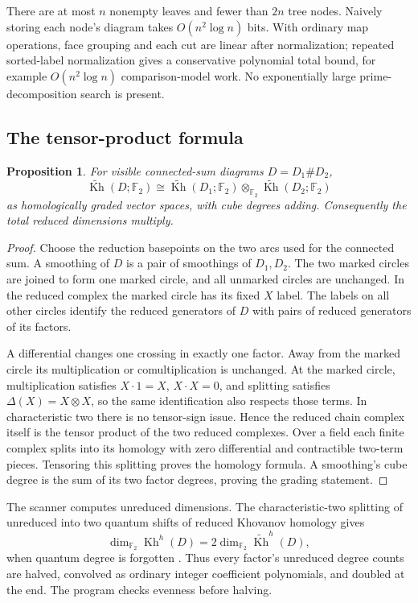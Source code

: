 \documentclass[11pt]{article}
\newtheorem{proposition}[theorem]{Proposition}
\theoremstyle{remark}\newtheorem{remark}[theorem]{Remark}
\newcommand{\F}{\mathbb F}
\newcommand{\Kh}{\operatorname{Kh}}
\newcommand{\rKh}{\widetilde{\operatorname{Kh}}}
\begin{document}
There are at most $n$ nonempty leaves and fewer than $2n$ tree nodes.
Naively storing each node's diagram takes $O(n^2\log n)$ bits. With ordinary
map operations, face grouping and each cut are linear after normalization;
repeated sorted-label normalization gives a conservative polynomial total
bound, for example $O(n^2\log n)$ comparison-model work. No exponentially
large prime-decomposition search is present.

\subsection{The tensor-product formula}
\begin{proposition}\label{prop:kun}
For visible connected-sum diagrams $D=D_1\#D_2$,
\[
 \rKh(D;\F_2)\cong\rKh(D_1;\F_2)\otimes_{\F_2}\rKh(D_2;\F_2)
\]
as homologically graded vector spaces, with cube degrees adding.
Consequently the total reduced dimensions multiply.
\end{proposition}
\begin{proof}
Choose the reduction basepoints on the two arcs used for the connected sum.
A smoothing of $D$ is a pair of smoothings of $D_1,D_2$. The two marked
circles are joined to form one marked circle, and all unmarked circles
are unchanged. In the reduced complex the marked circle has its fixed
$X$ label. The labels on all other circles identify the reduced generators
of $D$ with pairs of reduced generators of its factors.

A differential changes one crossing in exactly one factor. Away from the
marked circle its multiplication or comultiplication is unchanged. At the
marked circle, multiplication satisfies $X\cdot1=X$, $X\cdot X=0$,
and splitting satisfies $\Delta(X)=X\otimes X$, so the same identification
also respects those terms. In characteristic two there is no tensor-sign
issue. Hence the reduced chain complex itself is the tensor product of
the two reduced complexes. Over a field each finite complex splits into
its homology with zero differential and contractible two-term pieces.
Tensoring this splitting proves the homology formula. A smoothing's cube
degree is the sum of its two factor degrees, proving the grading statement.
\end{proof}

The scanner computes unreduced dimensions. The characteristic-two splitting
of unreduced into two quantum shifts of reduced Khovanov homology gives
\begin{equation}\label{eq:split}
 \dim_{\F_2}\Kh^h(D)=2\dim_{\F_2}\rKh^h(D),
\end{equation}
when quantum degree is forgotten \cite[Corollary 3.2.C]{Shumakovitch}.
Thus every factor's unreduced degree counts are halved, convolved as
ordinary integer coefficient polynomials, and doubled at the end.
The program checks evenness before halving.
\end{document}
